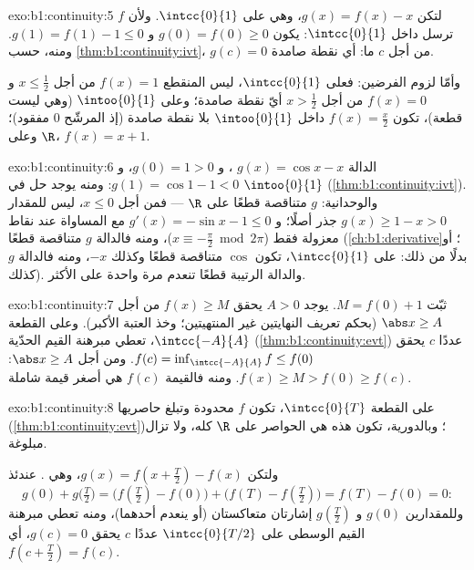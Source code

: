 \begin{solution}{exo:b1:continuity:5}
لتكن $g(x) = f(x) - x$، وهي  على $\intcc{0}{1}$. ولأن $f$ ترسل
داخل $\intcc{0}{1}$: يكون $g(0) = f(0) \geq 0$ و $g(1) = f(1) - 1 \leq
0$. ومنه، حسب \cref{thm:b1:continuity:ivt}، $g(c) = 0$ من أجل $c$ ما: أي
نقطة صامدة.

وأمّا لزوم الفرضين: فعلى $\intcc{0}{1}$، ليس  المنقطع
$f(x) = 1$ من أجل $x \leq \frac12$ و $f(x) = 0$ من أجل $x > \frac12$ أيّ
نقطة صامدة؛ وعلى  $\intoo{0}{1}$ (وهي ليست قطعة)، تكون $f(x) =
\frac x2$  داخل $\intoo{0}{1}$ بلا نقطة صامدة
(إذ المرشّح $0$ مفقود)؛ وعلى $\R$، $f(x) = x + 1$.
\end{solution}

\begin{solution}{exo:b1:continuity:6}
الدالة $g(x) = \cos x - x$ ، و $g(0) = 1 > 0$، و $g(1) = \cos 1 -
1 < 0$: ومنه يوجد حل في $\intoo{0}{1}$
(\cref{thm:b1:continuity:ivt}). والوحدانية: $g$ متناقصة
قطعًا على $\R$ --- فمن أجل $x \leq 0$، ليس للمقدار $g(x) \geq 1 - x > 0$
جذر أصلًا؛ و $g'(x) = -\sin x - 1 \leq 0$ مع المساواة عند
نقاط معزولة فقط ($x \equiv -\frac\pi2 \bmod 2\pi$)، ومنه فالدالة $g$
متناقصة قطعًا (\cref{ch:b1:derivative}؛ أو بدلًا من ذلك: على
$\intcc{0}{1}$، تكون $\cos$ متناقصة قطعًا وكذلك $-x$، ومنه فالدالة $g$
كذلك). والدالة الرتيبة قطعًا تنعدم مرة واحدة على الأكثر.
\end{solution}

\begin{solution}{exo:b1:continuity:7}
ثبّت $M = f(0) + 1$. يوجد $A > 0$ يحقق $f(x) \geq M$ من أجل $\abs x
\geq A$ (بحكم تعريف النهايتين غير المنتهيتين؛ وخذ العتبة
الأكبر). وعلى القطعة $\intcc{-A}{A}$، تعطي مبرهنة القيم الحدّية
(\cref{thm:b1:continuity:evt}) عددًا $c$ يحقق $f(c) =
\inf_{\intcc{-A}{A}} f \leq f(0)$. ومن أجل $\abs x \geq A$: $f(x) \geq M
> f(0) \geq f(c)$. ومنه فالقيمة $f(c)$ هي أصغر قيمة شاملة.
\end{solution}

\begin{solution}{exo:b1:continuity:8}
على القطعة $\intcc{0}{T}$، تكون $f$ محدودة وتبلغ حاصريها
(\cref{thm:b1:continuity:evt})؛ وبالدورية، تكون هذه هي الحواصر
على $\R$ كله، ولا تزال مبلوغة.

ولتكن $g(x) = f(x + \frac T2) - f(x)$، وهي . عندئذ
\[
g(0) + g\bigl(\tfrac T2\bigr)
= \bigl(f(\tfrac T2) - f(0)\bigr) + \bigl(f(T) - f(\tfrac T2)\bigr)
= f(T) - f(0) = 0 :
\]
وللمقدارين $g(0)$ و $g(\frac T2)$ إشارتان متعاكستان (أو ينعدم أحدهما)، ومنه
تعطي مبرهنة القيم الوسطى على $\intcc{0}{T/2}$ عددًا $c$ يحقق
$g(c) = 0$، أي $f(c + \frac T2) = f(c)$.
\end{solution}

